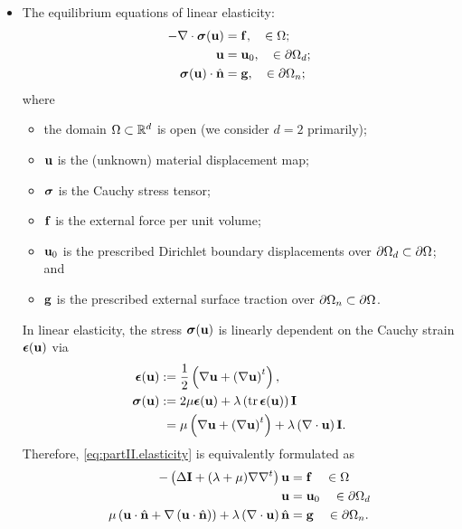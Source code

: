 \begin{itemize}
\item The equilibrium equations of linear elasticity:
\begin{subequations} \label{eq:partII.elasticity}
\begin{align}
-\nabla \cdot \boldsymbol{\sigma}(\mathbf{u}) & = \mathbf{f}, \quad \in \Omega; \\
\mathbf{u} & = \mathbf{u}_0, \quad \in \partial\Omega_d; \\
\boldsymbol{\sigma}(\mathbf{u}) \cdot \hat{\mathbf{n}} & = \mathbf{g}, \quad \in \partial\Omega_n;
\end{align}
\end{subequations}
where
\begin{itemize}
\item the domain $\Omega \subset \mathbb{R}^d$ is open (we consider $d = 2$ primarily);
\item $\mathbf{u}$ is the (unknown) material displacement map;
\item $\boldsymbol{\sigma}$ is the Cauchy stress tensor;
\item $\mathbf{f}$ is the external force per unit volume;
\item $\mathbf{u}_0$ is the prescribed Dirichlet boundary displacements over $\partial\Omega_d \subset \partial\Omega$; and
\item $\mathbf{g}$ is the prescribed external surface traction over $\partial\Omega_n \subset \partial\Omega$.
\end{itemize}
In linear elasticity, the stress $\boldsymbol{\sigma}(\mathbf{u})$ is linearly dependent on the Cauchy strain $\boldsymbol{\epsilon}(\mathbf{u})$ via
\begin{align*}
\boldsymbol{\epsilon}(\mathbf{u}) := {} & \frac{1}{2} \left( \nabla \mathbf{u} + \left( \nabla \mathbf{u} \right)^t \right), \\
\boldsymbol{\sigma}(\mathbf{u})   := {} & 2 \mu \boldsymbol{\epsilon}(\mathbf{u}) + \lambda \left( \operatorname{tr} \boldsymbol{\epsilon}(\mathbf{u}) \right) \mathbf{I} \\
                  = {} & \mu \left( \nabla \mathbf{u} + \left( \nabla \mathbf{u} \right)^t \right) + \lambda \left( \nabla \cdot \mathbf{u} \right) \mathbf{I}.
\end{align*}
Therefore, \eqref{eq:partII.elasticity} is equivalently formulated as
\begin{subequations} \label{eq:partII.LE}
\begin{align}
-\left( \Delta \mathbf{I} + (\lambda + \mu) \nabla \nabla^t \right) \mathbf{u} & = \mathbf{f} \quad \in \Omega \label{eq:partII.LE.PDE} \\
\mathbf{u} & = \mathbf{u}_0 \quad \in \partial\Omega_d \label{eq:partII.LE.D} \\
\mu \left( \mathbf{u} \cdot \hat{\mathbf{n}} + \nabla \left( \mathbf{u} \cdot \hat{\mathbf{n}} \right) \right) + \lambda \left( \nabla \cdot \mathbf{u} \right) \hat{\mathbf{n}} & = \mathbf{g} \quad \in \partial\Omega_n \label{eq:partII.LE.N}.
\end{align}
\end{subequations}

\end{itemize}

